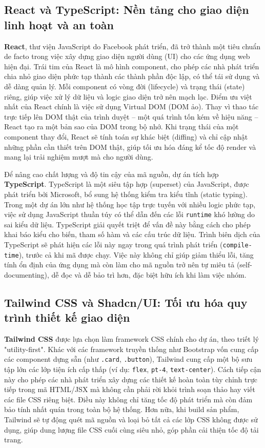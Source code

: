 \documentclass[../DoAn.tex]{subfiles}
\begin{document}
\subsection{React và TypeScript: Nền tảng cho giao diện linh hoạt và an toàn}

\textbf{React}, thư viện JavaScript do Facebook phát triển, đã trở thành một tiêu chuẩn de facto trong việc xây dựng giao diện người dùng (UI) cho các ứng dụng web hiện đại. Trái tim của React là mô hình component, cho phép các nhà phát triển chia nhỏ giao diện phức tạp thành các thành phần độc lập, có thể tái sử dụng và dễ dàng quản lý. Mỗi component có vòng đời (lifecycle) và trạng thái (state) riêng, giúp việc xử lý dữ liệu và logic giao diện trở nên mạch lạc. Điểm ưu việt nhất của React chính là việc sử dụng Virtual DOM (DOM ảo). Thay vì thao tác trực tiếp lên DOM thật của trình duyệt – một quá trình tốn kém về hiệu năng – React tạo ra một bản sao của DOM trong bộ nhớ. Khi trạng thái của một component thay đổi, React sẽ tính toán sự khác biệt (diffing) và chỉ cập nhật những phần cần thiết trên DOM thật, giúp tối ưu hóa đáng kể tốc độ render và mang lại trải nghiệm mượt mà cho người dùng.

Để nâng cao chất lượng và độ tin cậy của mã nguồn, dự án tích hợp \textbf{TypeScript}. TypeScript là một siêu tập hợp (superset) của JavaScript, được phát triển bởi Microsoft, bổ sung hệ thống kiểm tra kiểu tĩnh (static typing). Trong một dự án lớn như hệ thống học tập trực tuyến với nhiều logic phức tạp, việc sử dụng JavaScript thuần túy có thể dẫn đến các lỗi \texttt{runtime} khó lường do sai kiểu dữ liệu. TypeScript giải quyết triệt để vấn đề này bằng cách cho phép khai báo kiểu cho biến, tham số hàm và các cấu trúc dữ liệu. Trình biên dịch của TypeScript sẽ phát hiện các lỗi này ngay trong quá trình phát triển (\texttt{compile-time}), trước cả khi mã được chạy. Việc này không chỉ giúp giảm thiểu lỗi, tăng tính ổn định của ứng dụng mà còn làm cho mã nguồn trở nên tự miêu tả (self-documenting), dễ đọc và dễ bảo trì hơn, đặc biệt hữu ích khi làm việc nhóm.

\subsection{Tailwind CSS và Shadcn/UI: Tối ưu hóa quy trình thiết kế giao diện}

\textbf{Tailwind CSS} được lựa chọn làm framework CSS chính cho dự án, theo triết lý "utility-first". Khác với các framework truyền thống như Bootstrap vốn cung cấp các component dựng sẵn (như \texttt{.card}, \texttt{.button}), Tailwind cung cấp một bộ sưu tập lớn các lớp tiện ích cấp thấp (ví dụ: \texttt{flex}, \texttt{pt-4}, \texttt{text-center}). Cách tiếp cận này cho phép các nhà phát triển xây dựng các thiết kế hoàn toàn tùy chỉnh trực tiếp trong mã HTML/JSX mà không cần phải rời khỏi trình soạn thảo hay viết các file CSS riêng biệt. Điều này không chỉ tăng tốc độ phát triển mà còn đảm bảo tính nhất quán trong toàn bộ hệ thống. Hơn nữa, khi build sản phẩm, Tailwind sẽ tự động quét mã nguồn và loại bỏ tất cả các lớp CSS không được sử dụng, giúp dung lượng file CSS cuối cùng siêu nhỏ, góp phần cải thiện tốc độ tải trang.
\end{document}
